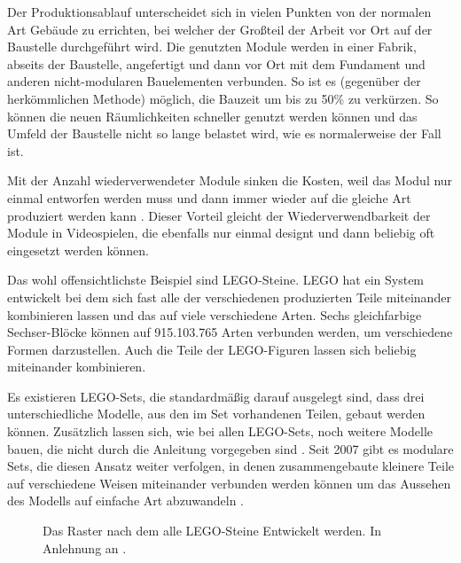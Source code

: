 Der Produktionsablauf unterscheidet sich in vielen Punkten von der normalen Art Gebäude zu errichten, bei welcher der Großteil der Arbeit vor Ort auf der Baustelle durchgeführt wird. Die genutzten Module werden in einer Fabrik, abseits der Baustelle, angefertigt und dann vor Ort mit dem  Fundament und anderen nicht-modularen Bauelementen verbunden. So ist es (gegenüber der herkömmlichen Methode) möglich, die Bauzeit um bis zu 50\%  zu verkürzen. So können die neuen Räumlichkeiten schneller genutzt werden können und das Umfeld der Baustelle nicht so lange belastet wird, wie es normalerweise der Fall ist. \parencite{Lawson}
\par
Mit der Anzahl wiederverwendeter Module sinken die Kosten, weil das Modul nur einmal entworfen werden muss und dann immer wieder auf die gleiche Art produziert werden kann \parencite{Lawson}. Dieser Vorteil gleicht der Wiederverwendbarkeit der Module in Videospielen, die ebenfalls nur einmal designt und dann beliebig oft eingesetzt werden können.
\par
Das wohl offensichtlichste Beispiel sind LEGO-Steine. LEGO hat ein System entwickelt bei dem sich fast alle der verschiedenen produzierten Teile miteinander kombinieren lassen und das auf viele verschiedene Arten. Sechs gleichfarbige Sechser-Blöcke können auf 915.103.765 Arten \parencite[S.\,10]{LegoBuch} verbunden werden, um verschiedene Formen darzustellen. Auch die Teile der LEGO-Figuren lassen sich beliebig miteinander kombinieren. 
\par
Es existieren LEGO-Sets, die standardmäßig darauf ausgelegt sind, dass drei unterschiedliche Modelle, aus den im Set vorhandenen Teilen, gebaut werden können. Zusätzlich lassen sich, wie bei allen LEGO-Sets, noch weitere Modelle bauen, die nicht durch die Anleitung vorgegeben sind \parencite{Lego3in1}. Seit 2007 gibt es modulare Sets, die diesen Ansatz weiter verfolgen, in denen zusammengebaute kleinere Teile auf verschiedene Weisen miteinander verbunden werden können um das Aussehen des Modells auf einfache Art abzuwandeln \parencite{LegoMod}.
\begin{figure}[H]
\centering
  \caption{Das Raster nach dem alle LEGO-Steine Entwickelt werden. In Anlehnung an \parencite[S.\,11]{LegoBuch}.}
\label{legoRaster}
\end{figure}

